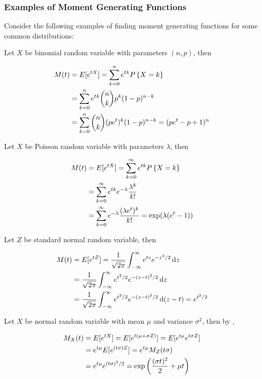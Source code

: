 \documentclass[a4paper,12pt]{article}
\begin{document}
\subsubsection{Examples of Moment Generating Functions}
Consider the following examples of finding moment generating functions for some common distributions:\n

\begin{exm}
  Let $X$ be binomial random variable with parameters $(n,p)$, then

  $$\begin{aligned}[t]
    M(t)&=E[e^{tX}]=\sum_{k=0}^{n}e^{tk}P\left\{ X=k\right\}\\
    &=\sum_{k=0}^{n}e^{tk}\binom{n}{k}p^{k}(1-p)^{n-k}\\
    &=\sum_{k=0}^{n}\binom{n}{k}(pe^{t})^{k}(1-p)^{n-k}=(pe^{t}-p+1)^{n}
  \end{aligned}$$
\end{exm}\n

\begin{exm}
  Let $X$ be Poisson random variable with parameters $\lambda$, then

  $$\begin{aligned}[t]
    M(t)&=E[e^{tX}]=\sum_{k=0}^{\infty}e^{tk}P\left\{ X=k\right\}\\
    &=\sum_{k=0}^{\infty}e^{tk}e^{-\lambda}\frac{\lambda^{k}}{k!}\\
    &=\sum_{k=0}^{\infty}e^{-\lambda}\frac{(\lambda e^{t})^{k}}{k!}=\exp(\lambda(e^{t}-1))
  \end{aligned}$$
\end{exm}\n

\begin{exm}
  Let $Z$ be standard normal random variable, then

  $$\begin{aligned}[t]
    M(t)&=E[e^{tZ}]=\frac{1}{\sqrt{2\pi}}\int_{-\infty}^{\infty}e^{tz}e^{-z^{2}/2}\,\mathrm{d} z\\
    &=\frac{1}{\sqrt{2\pi}}\int_{-\infty}^{\infty}e^{t^{2}/2}e^{-(z-t)^{2}/2}\,\mathrm{d} z\\
    &=\frac{1}{\sqrt{2\pi}}\int_{-\infty}^{\infty}e^{t^{2}/2}e^{-(z-t)^{2}/2}\,\mathrm{d}(z-t)=e^{t^{2}/2}
  \end{aligned}$$
\end{exm}\n

\begin{exm}
  Let $X$ be normal random variable with mean $\mu$ and variance $\sigma^{2}$, then by \rexm[\sctd{1}],

  $$\begin{aligned}[t]
    M_{X}(t)&=E[e^{tX}]=E[e^{t(\mu+\sigma Z)}]=E[e^{t\mu}e^{t\sigma Z}]\\
    &=e^{t\mu}E[e^{(t\sigma)Z}]=e^{t\mu}M_{Z}(t\sigma)\\
    &=e^{t\mu}e^{(t\sigma)^{2}/2}=\exp\left( \frac{(\sigma t)^{2}}{2}+\mu t\right)
  \end{aligned}$$
\end{exm}
\end{document}
